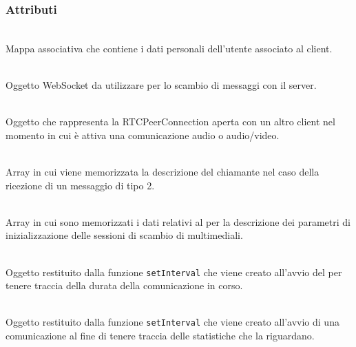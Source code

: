 \subsubsection*{Attributi}
\begin{description}
  \item{}\\
  Mappa associativa  che contiene i dati personali dell'utente associato al client.

  \item{}\\
  Oggetto WebSocket da utilizzare per lo scambio di messaggi con il server.

  \item{}\\
  Oggetto che rappresenta la RTCPeerConnection aperta con un altro client nel momento in cui è attiva una comunicazione audio o audio/video.
  
  \item{}\\
  Array in cui viene memorizzata la descrizione del  chiamante nel caso della ricezione di un messaggio di tipo 2.
  
  \item{}\\
  Array in cui sono memorizzati i dati relativi al  per la descrizione dei parametri di inizializzazione delle sessioni di scambio di  multimediali.
  
  \item{}\\
  Oggetto restituito dalla funzione \verb'setInterval' che viene creato all'avvio del  per tenere traccia della durata della comunicazione in corso.
  
  \item{}\\
  Oggetto restituito dalla funzione \verb'setInterval' che viene creato all'avvio di una comunicazione al fine di tenere traccia delle statistiche che la riguardano.

\end{description}

